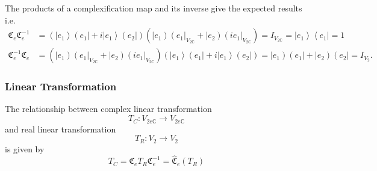 \documentclass[aps,preprint]{revtex4}%
\begin{document}
The products of a complexification map and its inverse give the expected
results i.e.
\begin{align}
\mathfrak{C}_{e}\mathfrak{C}_{e}^{-1}  &  =\left(  \left\vert e_{1}%
\right\rangle \left(  e_{1}\right\vert +i\left\vert e_{1}\right\rangle \left(
e_{2}\right\vert \right)  \left(  \left\vert e_{1}\right)  \left(
e_{1}\right\vert _{V_{2\mathbb{C}}}+\left\vert e_{2}\right)  \left(
ie_{1}\right\vert _{V_{2\mathbb{C}}}\right)  =I_{V_{2\mathbb{C}}}=\left\vert
e_{1}\right\rangle \left\langle e_{1}\right\vert =1\\
\mathfrak{C}_{e}^{-1}\mathfrak{C}_{e}  &  =\left(  \left\vert e_{1}\right)
\left(  e_{1}\right\vert _{V_{2\mathbb{C}}}+\left\vert e_{2}\right)  \left(
ie_{1}\right\vert _{V_{2\mathbb{C}}}\right)  \left(  \left\vert e_{1}%
\right\rangle \left(  e_{1}\right\vert +i\left\vert e_{1}\right\rangle \left(
e_{2}\right\vert \right)  =\left\vert e_{1}\right)  \left(  e_{1}\right\vert
+\left\vert e_{2}\right)  \left(  e_{2}\right\vert =I_{V_{2}}.
\end{align}


\subsubsection{Linear Transformation}

The relationship between complex linear transformation
\begin{equation}
T_{C}:V_{2e\mathbb{C}}\rightarrow V_{2e\mathbb{C}}%
\end{equation}
and real linear transformation
\begin{equation}
T_{R}:V_{2}\rightarrow V_{2}%
\end{equation}
is given by%
\begin{equation}
T_{C}=\mathfrak{C}_{e}T_{R}\mathfrak{C}_{e}^{-1}=\widehat{\mathfrak{C}}%
_{e}\left(  T_{R}\right)
\end{equation}
\end{document}

